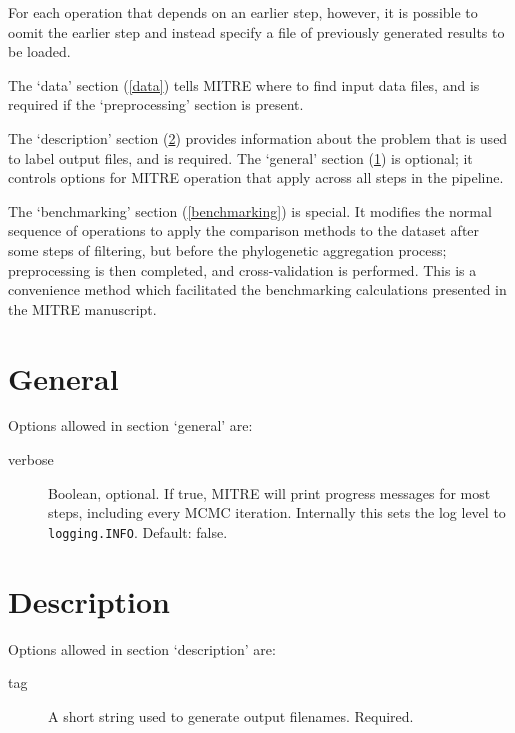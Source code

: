 \documentclass[12pt]{report}
\begin{document}
For each operation that depends on an earlier step, however, it is
possible to oomit the earlier step and instead specify a file of
previously generated results to be loaded.

The `data' section (\ref{data}) tells MITRE where to find input data files,
and is required if the `preprocessing' section is present.

The `description' section (\ref{description}) provides information
about the problem that is used to label output files, and is
required. The `general' section (\ref{general}) is optional; it
controls options for MITRE operation that apply across all steps in
the pipeline.

The `benchmarking' section (\ref{benchmarking}) is special. It
modifies the normal sequence of operations to apply the comparison
methods to the dataset after some steps of filtering, but before the
phylogenetic aggregation process; preprocessing is then completed, and
cross-validation is performed. This is a convenience method which
facilitated the benchmarking calculations presented in the MITRE
manuscript.

\section{General}\label{general}
Options allowed in section `general' are:
\begin{description}
\item[verbose] Boolean, optional. If true, MITRE will print progress
  messages for most steps, including every MCMC iteration. Internally
  this sets the log level to \texttt{logging.INFO}. Default: false.
\end{description}

\section{Description}\label{description}
Options allowed in section `description' are:
\begin{description}
\item[tag] A short string used to generate output filenames. Required.
\end{description}
\end{document}
